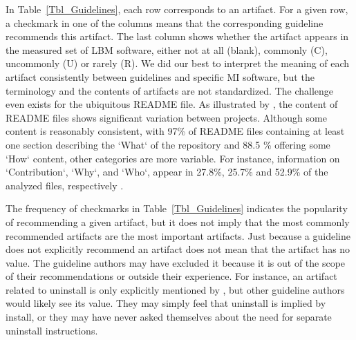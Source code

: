 \documentclass[final, 3p, times, authoryear]{elsarticle}
\begin{document}
In Table~\ref{Tbl_Guidelines}, each row corresponds to an artifact.  For a given
row, a checkmark in one of the columns means that the corresponding guideline
recommends this artifact.  The last column shows whether the artifact appears in
the measured set of LBM software, either not at all (blank), commonly (C),
uncommonly (U) or rarely (R).  We did our best to interpret the meaning of each
artifact consistently between guidelines and specific MI software, but the
terminology and the contents of artifacts are not standardized.  The challenge
even exists for the ubiquitous README file.  As illustrated by
\citet{PranaEtAl2018}, the content of README files shows significant variation
between projects.  Although some content is reasonably consistent, with 97\% of
README files containing at least one section describing the `What` of the
repository and 88.5 \% offering some `How` content, other categories are more
variable.  For instance, information on `Contribution`, `Why`, and `Who`,
appear in 27.8\%, 25.7\% and 52.9\% of the analyzed files, respectively
\citep{PranaEtAl2018}.  

The frequency of checkmarks in Table~\ref{Tbl_Guidelines} indicates the
popularity of recommending a given artifact, but it does not imply that the most
commonly recommended artifacts are the most important artifacts. Just because a
guideline does not explicitly recommend an artifact does not mean that the
artifact has no value.  The guideline authors may have excluded it because it is
out of the scope of their recommendations or outside their experience. For
instance, an artifact related to uninstall is only explicitly mentioned by
\citet{vanGompelEtAl2016}, but other guideline authors would likely see its
value.  They may simply feel that uninstall is implied by install, or they may
have never asked themselves about the need for separate uninstall instructions.
\end{document}
